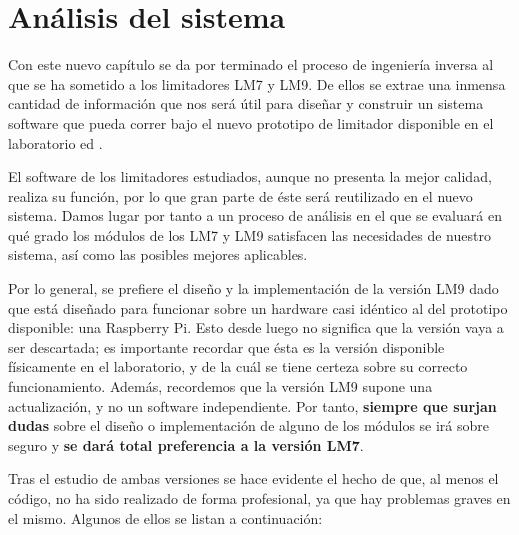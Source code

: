 \chapter{Análisis del sistema} \label{cap:capitulo4}

Con este nuevo capítulo se da por terminado el proceso de ingeniería inversa al que se ha sometido a los limitadores \acrshort{LM7} y \acrshort{LM9}. De ellos se extrae una inmensa cantidad de información que nos será útil para diseñar y construir un sistema software que pueda correr bajo el nuevo prototipo de limitador disponible en el laboratorio ed .

El software de los limitadores estudiados, aunque no presenta la mejor calidad, realiza su función, por lo que gran parte de éste será reutilizado en el nuevo sistema. Damos lugar por tanto a un proceso de análisis en el que se evaluará en qué grado los módulos de los \acrshort{LM7} y \acrshort{LM9} satisfacen las necesidades de nuestro sistema, así como las posibles mejores aplicables.

Por lo general, se prefiere el diseño y la implementación de la versión \acrshort{LM9} dado que está diseñado para funcionar sobre un hardware casi idéntico al del prototipo disponible: una Raspberry Pi. Esto desde luego no significa que la versión vaya a ser descartada; es importante recordar que ésta es la versión disponible físicamente en el laboratorio, y de la cuál se tiene certeza sobre su correcto funcionamiento. Además, recordemos que la versión \acrshort{LM9} supone una actualización, y no un software independiente. Por tanto, \textbf{siempre que surjan dudas} sobre el diseño o implementación de alguno de los módulos se irá sobre seguro y \textbf{se dará total preferencia a la versión \acrshort{LM7}}.

Tras el estudio de ambas versiones se hace evidente el hecho de que, al menos el código, no ha sido realizado de forma profesional, ya que hay problemas graves en el mismo. Algunos de ellos se listan a continuación:

